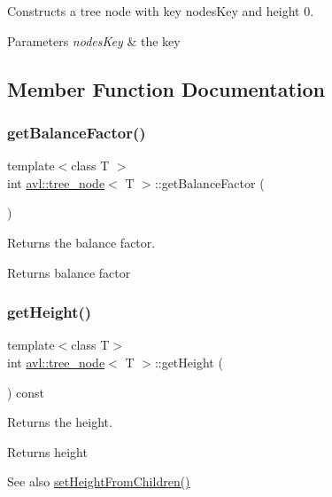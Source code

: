 Constructs a tree node with key nodes\+Key and height 0. 
\begin{DoxyParams}{Parameters}
{\em nodes\+Key} & the key \\
\hline
\end{DoxyParams}


\subsection{Member Function Documentation}
\mbox{\label{classavl_1_1tree__node_a9479f47445788e79be7ad81c2f9ca9c4}} 
\subsubsection{\texorpdfstring{get\+Balance\+Factor()}{getBalanceFactor()}}
{\footnotesize\ttfamily template$<$class T $>$ \\
int \hyperlink{classavl_1_1tree__node}{avl\+::tree\+\_\+node}$<$ T $>$\+::get\+Balance\+Factor (\begin{DoxyParamCaption}{ }\end{DoxyParamCaption})}

Returns the balance factor. \begin{DoxyReturn}{Returns}
balance factor 
\end{DoxyReturn}
\mbox{\label{classavl_1_1tree__node_ab298d8df03ff6414ff7280bbdbb16e8a}} 
\subsubsection{\texorpdfstring{get\+Height()}{getHeight()}}
{\footnotesize\ttfamily template$<$class T$>$ \\
int \hyperlink{classavl_1_1tree__node}{avl\+::tree\+\_\+node}$<$ T $>$\+::get\+Height (\begin{DoxyParamCaption}{ }\end{DoxyParamCaption}) const\hspace{0.3cm}{\ttfamily [inline]}}

Returns the height. \begin{DoxyReturn}{Returns}
height 
\end{DoxyReturn}
\begin{DoxySeeAlso}{See also}
\hyperlink{classavl_1_1tree__node_a5e3b8788433571c4b8462d2cf2d689b9}{set\+Height\+From\+Children()} 
\end{DoxySeeAlso}
\mbox{\label{classavl_1_1tree__node_a27d17e38312d380b79da420bbc0da99d}} 
